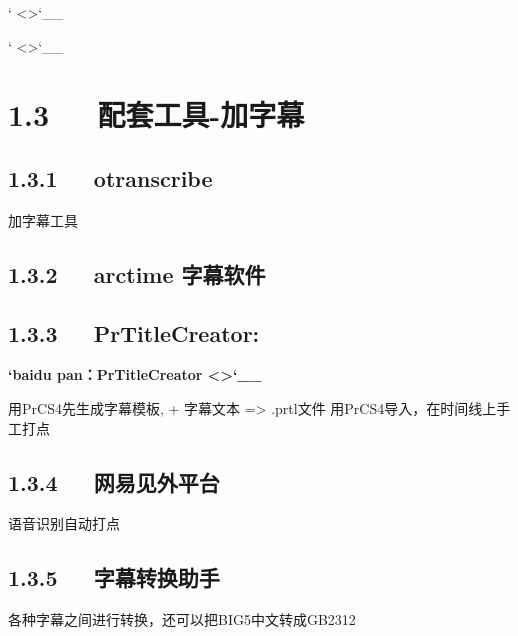 \documentclass[letterpaper,12pt,english]{sphinxmanual}
\begin{document}
{}` \textless{}\textgreater{}{}`\_\_

{}` \textless{}\textgreater{}{}`\_\_


\section{1.3   配套工具-加字幕}
\label{\detokenize{001software/001install/adobe:id2}}

\subsection{1.3.1   otranscribe}
\label{\detokenize{001software/001install/adobe:otranscribe}}


加字幕工具



\subsection{1.3.2   arctime 字幕软件}
\label{\detokenize{001software/001install/adobe:arctime}}

\subsection{1.3.3   PrTitleCreator:}
\label{\detokenize{001software/001install/adobe:prtitlecreator}}
{\color{red}\bfseries{}{}`baidu pan：PrTitleCreator \textless{}\textgreater{}{}`\_\_}

用PrCS4先生成字幕模板, + 字幕文本 =\textgreater{} .prtl文件 用PrCS4导入，在时间线上手工打点



\subsection{1.3.4   网易见外平台}
\label{\detokenize{001software/001install/adobe:id3}}

语音识别自动打点


\subsection{1.3.5   字幕转换助手}
\label{\detokenize{001software/001install/adobe:id4}}
各种字幕之间进行转换，还可以把BIG5中文转成GB2312
\end{document}
